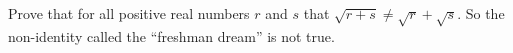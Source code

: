 Prove that for all positive real numbers $r$ and $s$ that $\sqrt{r + s} \neq \sqrt{r} + \sqrt{s}$. So the non-identity called the ``freshman dream'' is not true.
